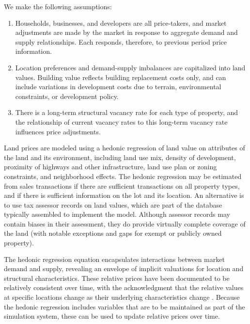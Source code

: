 \documentclass[fleqn]{article}
\begin{document}
We make the following assumptions:

\begin{enumerate}

\item Households, businesses, and developers are all
price-takers, and market adjustments are made by the market in
response to aggregate demand and supply relationships.  Each
responds, therefore, to previous period price information.

\item
Location preferences and demand-supply imbalances are capitalized
into land values.  Building value reflects building replacement
costs only, and can include variations in development costs due to
terrain, environmental constraints, or development policy.

\item
There is a long-term structural vacancy rate for each type of
property, and the relationship of current vacancy rates to this
long-term vacancy rate influences price adjustments.
\end{enumerate}

Land prices are modeled using a hedonic regression
\cite{waddell-hedonic-1993} of land value on attributes of the
land and its environment, including land use mix, density of
development, proximity of highways and other infrastructure, land
use plan or zoning constraints, and neighborhood effects.  The
hedonic regression may be estimated from sales transactions if
there are sufficient transactions on all property types, and if
there is sufficient information on the lot and its location.  An
alternative is to use tax assessor records on land values, which
are part of the database typically assembled to implement the
model.  Although assessor records may contain biases in their
assessment, they do provide virtually complete coverage of the
land (with notable exceptions and gaps for exempt or publicly
owned property).

The hedonic regression equation encapsulates interactions between
market demand and supply, revealing an envelope of implicit
valuations for location and structural characteristics.  These
relative prices have been documented to be relatively consistent
over time, with the acknowledgment that the relative values at
specific locations change as their underlying characteristics
change \cite{dipasquale-wheaton-1996}.  Because the hedonic
regression includes variables that are to be maintained as part of
the simulation system, these can be used to update relative prices
over time.
\end{document}
